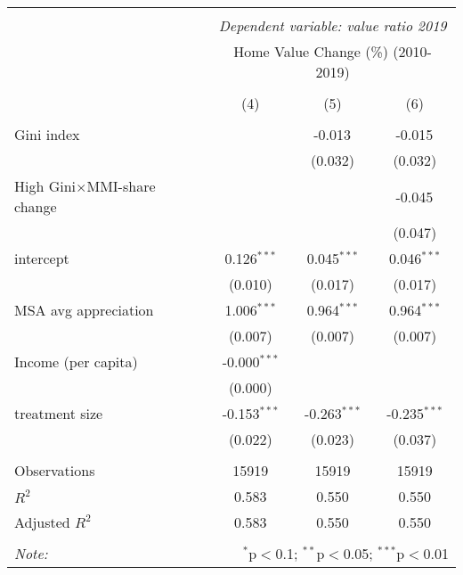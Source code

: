 \documentclass[11pt]{article}
\begin{document}
\begin{table}[H] \centering
    \begin{tabular}{@{\extracolsep{5pt}}lccc}
    \\[-1.8ex]\hline
    \hline \\[-1.8ex]
    & \multicolumn{3}{c}{\textit{Dependent variable: value ratio 2019}} \
    \cr \cline{2-4}
    \\[-1.8ex] & \multicolumn{3}{c}{Home Value Change (\%) (2010-2019)}  \\
    \\[-1.8ex] & (4) & (5) & (6) \\
    \hline \\[-1.8ex]
    Gini index & & -0.013$^{}$ & -0.015$^{}$ \\
   & & (0.032) & (0.032) \\
   High Gini$\times$MMI-share change & & & -0.045$^{}$ \\
   & & & (0.047) \\
    intercept & 0.126$^{***}$ & 0.045$^{***}$ & 0.046$^{***}$ \\
   & (0.010) & (0.017) & (0.017) \\
   MSA avg appreciation & 1.006$^{***}$ & 0.964$^{***}$ & 0.964$^{***}$ \\
   & (0.007) & (0.007) & (0.007) \\
    Income (per capita) & -0.000$^{***}$ & & \\
   & (0.000) & & \\
    treatment size & -0.153$^{***}$ & -0.263$^{***}$ & -0.235$^{***}$ \\
   & (0.022) & (0.023) & (0.037) \\
   \hline \\[-1.8ex]
    Observations & 15919 & 15919 & 15919 \\
    $R^2$ & 0.583 & 0.550 & 0.550 \\
    Adjusted $R^2$ & 0.583 & 0.550 & 0.550 \\
    \hline
    \hline \\[-1.8ex]
    \textit{Note:} & \multicolumn{3}{r}{$^{*}$p$<$0.1; $^{**}$p$<$0.05; $^{***}$p$<$0.01} \\
    \end{tabular}
\end{table}
        
\end{document}
